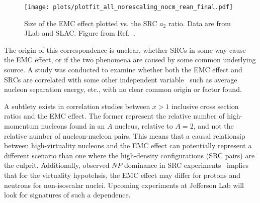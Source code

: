 \begin{figure}[tbp]
  \centering\texttt{[image: plots/plotfit\_all\_norescaling\_nocm\_rean\_final.pdf]}
  \caption{Size of the EMC effect plotted vs. the SRC $a_2$ ratio. Data are from JLab and SLAC. Figure
  from Ref.~\cite{Arrington:2012ax}.}
  \label{fig:emc_src_bff}
\end{figure}

The origin of this correspondence is unclear, whether SRCs in some way cause the EMC effect, or if the two
phenomena are caused by some common underlying source.  A study was conducted to examine whether
both the EMC effect and SRCs are correlated with some other independent variable~\cite{Arrington:2012ax} such
as average nucleon separation energy, etc., with no clear common origin or factor found.

A subtlety exists in correlation studies between $x>1$ inclusive cross section ratios and the EMC effect.  The former represent the relative number of high-momentum nucleons found in an $A$ nucleus, relative to $A=2$, and not the relative number of nucleon-nucleon pairs.  This means that a causal relationsip between high-virtuality nucleons and the EMC effect can potentially represent a different scenario than one where the high-density configurations (SRC pairs) are the culprit.  Additionally, observed $NP$ dominance in SRC experiments~\cite{Subedi:2008zz} implies that for the virtuality hypotehsis, the EMC effect may differ for protons and neutrons for non-isoscalar nuclei.  Upcoming experiments at Jefferson Lab will look for signatures of such a dependence. 
